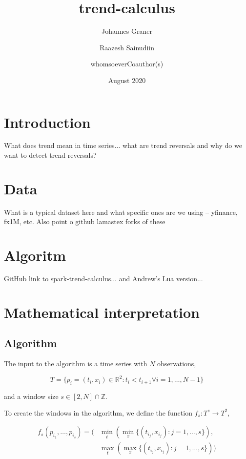 \documentclass[a4paper, 12pt]{article}
\title{trend-calculus}
\author{Johannes Graner \and Raazesh Sainudiin \and whomsoeverCoauthor(s)}
\date{August 2020}
\begin{document}
\maketitle

\section{Introduction}

What does trend mean in time series... what are trend reversals and why do we want to detect trend-reversals? %


\section{Data}

What is a typical dataset here and what specific ones are we using -- yfinance, fx1M, etc. Also point o github lamastex forks of these 

\section{Algoritm}

GitHub link to spark-trend-calculus... and Andrew's Lua version...

\section{Mathematical interpretation}

\subsection{Algorithm}

The input to the algorithm is a time series with $N$ observations, 

\[ T = \{ p_i = (t_i, x_i) \in \mathbb{R}^2 : t_i < t_{i+1} \forall i = 1, \dots, N-1 \} \]

and a window size $s \in [2, N] \cap \mathbb{Z}$.

To create the windows in the algorithm, we define the function $f_s : T^s \to T^2$,

\begin{align*}
    f_s(p_{i_1}, \dots, p_{i_s}) = ( & \min_t (\min_x \{ (t_{i_j}, x_{i_j}) : j = 1,\dots,s \}), \\
    & \max_t (\max_x \{ (t_{i_j}, x_{i_j}) : j = 1,\dots,s \}) )
\end{align*}
\end{document}
